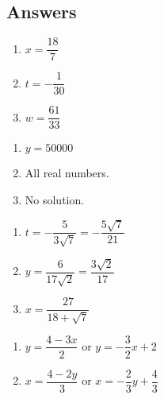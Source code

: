 \documentclass{ximera}
\begin{document}
\newpage

\subsection{Answers}

\begin{multicols}{3}
\begin{enumerate}

\item $x = \dfrac{18}{7}$
\item $t = -\dfrac{1}{30}$
\item $w = \dfrac{61}{33}$

\setcounter{HW}{\value{enumi}}
\end{enumerate}
\end{multicols}

\begin{multicols}{3}
\begin{enumerate}
\setcounter{enumi}{\value{HW}}

\item  $y = 50000$
\item  All real numbers.
\item  No solution.

\setcounter{HW}{\value{enumi}}
\end{enumerate}
\end{multicols}


\begin{multicols}{3}
\begin{enumerate}
\setcounter{enumi}{\value{HW}}

\item  $t = -\dfrac{5}{3\sqrt{7}} = -\dfrac{5\sqrt{7}}{21}$
\item  $y = \dfrac{6}{17\sqrt{2}}  = \dfrac{3 \sqrt{2}}{17}$
\item  $x = \dfrac{27}{18+\sqrt{7}}$

\setcounter{HW}{\value{enumi}}
\end{enumerate}
\end{multicols}

\begin{multicols}{2}
\begin{enumerate}
\setcounter{enumi}{\value{HW}}
\item  $y = \dfrac{4 - 3x}{2}$ or $y = -\dfrac{3}{2}x + 2$
\item  $x = \dfrac{4 - 2y}{3}$ or $x = -\dfrac{2}{3} y + \dfrac{4}{3}$
\setcounter{HW}{\value{enumi}}
\end{enumerate}
\end{multicols}
\end{document}
